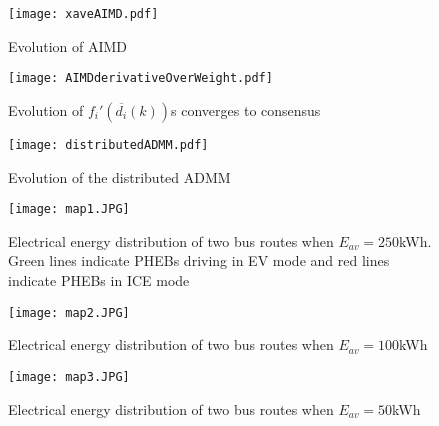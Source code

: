 \documentclass[journal]{IEEEtran}
\begin{document}
\begin{figure}[htbp]
	\begin{center}
		{\texttt{[image: xaveAIMD.pdf]}}
		\caption{Evolution of AIMD}
		\label{AIMD1}
	\end{center}
\end{figure}


\begin{figure}[htbp]
	\begin{center}
		\hspace{-1cm}
		{\texttt{[image: AIMDderivativeOverWeight.pdf]}}
		\caption{Evolution of $f_i'(\overline{d_i}(k))$s converges to consensus}
		\label{AIMD2}
	\end{center}
\end{figure}


\begin{figure}[htbp]
	\begin{center}
		\hspace{-1cm}
		{\texttt{[image: distributedADMM.pdf]}}
		\caption{Evolution of the distributed ADMM}
		\label{ADMMresults}
	\end{center}
\end{figure}


\begin{figure}[htbp]
	\begin{center}
		{\texttt{[image: map1.JPG]}}
		\hspace{0.2cm}
		\caption{Electrical energy distribution of two bus routes when $E_{av} = 250$kWh. Green lines indicate PHEBs driving in EV mode and red lines indicate PHEBs in ICE mode}
		\label{Eav250}
	\end{center}
\end{figure}


\begin{figure}[htbp]
	\begin{center}
		\vspace{0.5cm}
		{\texttt{[image: map2.JPG]}}
		\caption{Electrical energy distribution of two bus routes when $E_{av} = 100$kWh}
		\label{Eav100}
	\end{center}
\end{figure}



\begin{figure}[htbp]
	\begin{center}
		\vspace{0.25cm}
		{\texttt{[image: map3.JPG]}}
		\caption{Electrical energy distribution of two bus routes when $E_{av} = 50$kWh}
		\label{Eav50}
	\end{center}
\end{figure}
\end{document}
